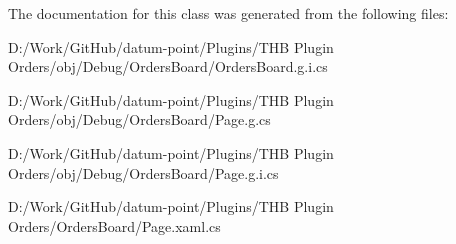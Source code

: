 The documentation for this class was generated from the following files\+:\begin{DoxyCompactItemize}
\item 
D\+:/\+Work/\+Git\+Hub/datum-\/point/\+Plugins/\+T\+H\+B Plugin Orders/obj/\+Debug/\+Orders\+Board/Orders\+Board.\+g.\+i.\+cs\item 
D\+:/\+Work/\+Git\+Hub/datum-\/point/\+Plugins/\+T\+H\+B Plugin Orders/obj/\+Debug/\+Orders\+Board/Page.\+g.\+cs\item 
D\+:/\+Work/\+Git\+Hub/datum-\/point/\+Plugins/\+T\+H\+B Plugin Orders/obj/\+Debug/\+Orders\+Board/Page.\+g.\+i.\+cs\item 
D\+:/\+Work/\+Git\+Hub/datum-\/point/\+Plugins/\+T\+H\+B Plugin Orders/\+Orders\+Board/Page.\+xaml.\+cs\end{DoxyCompactItemize}
